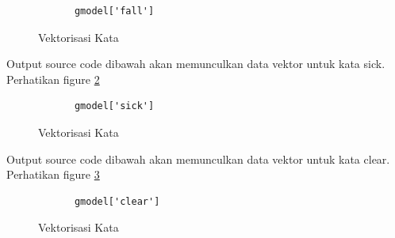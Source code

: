\begin{enumerate}
		\begin{verbatim}
			gmodel['fall']
		\end{verbatim}

		\begin{figure}[!htbp]
			\caption{Vektorisasi Kata}
			\label{YNC5-8}
		\end{figure}

Output source code dibawah akan memunculkan data vektor untuk kata sick. Perhatikan figure \ref{YNC5-9}

		\begin{verbatim}
			gmodel['sick']
		\end{verbatim}

		\begin{figure}[!htbp]
			\caption{Vektorisasi Kata}
			\label{YNC5-9}
		\end{figure}

Output source code dibawah akan memunculkan data vektor untuk kata clear. Perhatikan figure \ref{YNC5-10}

		\begin{verbatim}
			gmodel['clear']
		\end{verbatim}

		\begin{figure}[!htbp]
			\caption{Vektorisasi Kata}
			\label{YNC5-10}
		\end{figure}


\end{enumerate}
